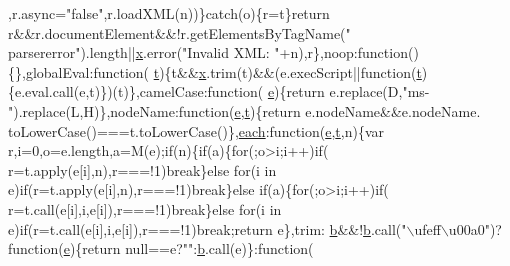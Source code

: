 \begin{DoxyCode}
      ,r.async=\textcolor{stringliteral}{"false"},r.loadXML(n))\}\textcolor{keywordflow}{catch}(o)\{r=t\}\textcolor{keywordflow}{return} r&&r.documentElement&&!r.getElementsByTagName(\textcolor{stringliteral}{"
      parsererror"}).length||\hyperlink{jquery-1_810_82_8min_8js_a5ce50d751c9664d05375c8f5080ed43e}{x}.error(\textcolor{stringliteral}{"Invalid XML: "}+n),r\},noop:\textcolor{keyword}{function}()\{\},globalEval:\textcolor{keyword}{function}(
      \hyperlink{jquery-1_810_82_8min_8js_a23c5666e83bbbceee94adcd0851f50c4}{t})\{t&&\hyperlink{jquery-1_810_82_8min_8js_a5ce50d751c9664d05375c8f5080ed43e}{x}.trim(t)&&(e.execScript||\textcolor{keyword}{function}(\hyperlink{jquery-1_810_82_8min_8js_a23c5666e83bbbceee94adcd0851f50c4}{t})\{e.eval.call(e,t)\})(t)\},camelCase:\textcolor{keyword}{function}(
      \hyperlink{jquery-1_810_82_8min_8js_a2c038346d47955cbe2cb91e338edd7e1}{e})\{\textcolor{keywordflow}{return} e.replace(D,\textcolor{stringliteral}{"ms-"}).replace(L,H)\},nodeName:\textcolor{keyword}{function}(\hyperlink{jquery-1_810_82_8min_8js_a2c038346d47955cbe2cb91e338edd7e1}{e},\hyperlink{jquery-1_810_82_8min_8js_a23c5666e83bbbceee94adcd0851f50c4}{t})\{\textcolor{keywordflow}{return} e.nodeName&&e.nodeName.
      toLowerCase()===t.toLowerCase()\},\hyperlink{jquery-1_810_82_8min_8js_a6f451301b91d40514a108ee16d72af50}{each}:\textcolor{keyword}{function}(\hyperlink{jquery-1_810_82_8min_8js_a2c038346d47955cbe2cb91e338edd7e1}{e},\hyperlink{jquery-1_810_82_8min_8js_a23c5666e83bbbceee94adcd0851f50c4}{t},n)\{var r,i=0,o=e.length,a=M(e);\textcolor{keywordflow}{if}(n)\{\textcolor{keywordflow}{if}(a)\{\textcolor{keywordflow}{for}(;o>i;i++)\textcolor{keywordflow}{if}(
      r=t.apply(e[i],n),r===!1)\textcolor{keywordflow}{break}\}\textcolor{keywordflow}{else} \textcolor{keywordflow}{for}(i in e)\textcolor{keywordflow}{if}(r=t.apply(e[i],n),r===!1)\textcolor{keywordflow}{break}\}\textcolor{keywordflow}{else} \textcolor{keywordflow}{if}(a)\{\textcolor{keywordflow}{for}(;o>i;i++)\textcolor{keywordflow}{if}(
      r=t.call(e[i],i,e[i]),r===!1)\textcolor{keywordflow}{break}\}\textcolor{keywordflow}{else} \textcolor{keywordflow}{for}(i in e)\textcolor{keywordflow}{if}(r=t.call(e[i],i,e[i]),r===!1)\textcolor{keywordflow}{break};\textcolor{keywordflow}{return} e\},trim:
      \hyperlink{bootstrap_8min_8js_ac0431efac4d7c393d1e70b86115cb93f}{b}&&!\hyperlink{bootstrap_8min_8js_ac0431efac4d7c393d1e70b86115cb93f}{b}.call(\textcolor{stringliteral}{"\(\backslash\)ufeff\(\backslash\)u00a0"})?\textcolor{keyword}{function}(\hyperlink{jquery-1_810_82_8min_8js_a2c038346d47955cbe2cb91e338edd7e1}{e})\{\textcolor{keywordflow}{return} null==e?\textcolor{stringliteral}{""}:\hyperlink{bootstrap_8min_8js_ac0431efac4d7c393d1e70b86115cb93f}{b}.call(e)\}:\textcolor{keyword}{function}(

\end{DoxyCode}
